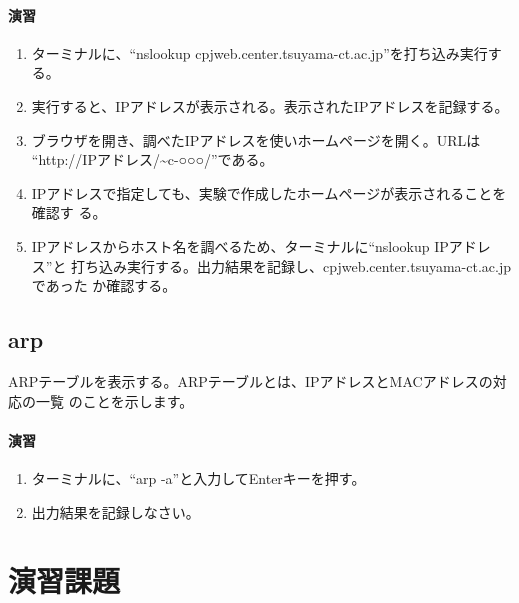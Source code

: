 \paragraph{演習}
\begin{enumerate}
\item ターミナルに、``nslookup cpjweb.center.tsuyama-ct.ac.jp''を打ち込み実行する。
\item 実行すると、IPアドレスが表示される。表示されたIPアドレスを記録する。
\item ブラウザを開き、調べたIPアドレスを使いホームページを開く。URLは
      ``http://IPアドレス/\~{}c-○○○/''である。
\item IPアドレスで指定しても、実験で作成したホームページが表示されることを確認す
      る。
\item IPアドレスからホスト名を調べるため、ターミナルに``nslookup IPアドレス''と
      打ち込み実行する。出力結果を記録し、cpjweb.center.tsuyama-ct.ac.jpであった
      か確認する。
\end{enumerate}

\subsection{arp}
ARPテーブルを表示する。ARPテーブルとは、IPアドレスとMACアドレスの対応の一覧
のことを示します。

\paragraph{演習}
\begin{enumerate}
\item ターミナルに、``arp -a''と入力してEnterキーを押す。
\item 出力結果を記録しなさい。
\end{enumerate}

\section{演習課題}

